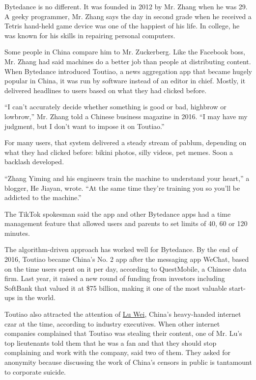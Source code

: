 Bytedance is no different. It was founded in 2012 by Mr. Zhang when he
was 29. A geeky programmer, Mr. Zhang says the day in second grade when
he received a Tetris hand-held game device was one of the happiest of
his life. In college, he was known for his skills in repairing personal
computers.

Some people in China compare him to Mr. Zuckerberg. Like the Facebook
boss, Mr. Zhang had said machines do a better job than people at
distributing content. When Bytedance introduced Toutiao, a news
aggregation app that became hugely popular in China, it was run by
software instead of an editor in chief. Mostly, it delivered headlines
to users based on what they had clicked before.

``I can't accurately decide whether something is good or bad, highbrow
or lowbrow,'' Mr. Zhang told a Chinese business magazine in 2016. ``I
may have my judgment, but I don't want to impose it on Toutiao.''

For many users, that system delivered a steady stream of pablum,
depending on what they had clicked before: bikini photos, silly videos,
pet memes. Soon a backlash developed.

``Zhang Yiming and his engineers train the machine to understand your
heart,'' a blogger, He Jiayan, wrote. ``At the same time they're
training you so you'll be addicted to the machine.''

The TikTok spokesman said the app and other Bytedance apps had a time
management feature that allowed users and parents to set limits of 40,
60 or 120 minutes.

The algorithm-driven approach has worked well for Bytedance. By the end
of 2016, Toutiao became China's No. 2 app after the messaging app
WeChat, based on the time users spent on it per day, according to
QuestMobile, a Chinese data firm. Last year, it raised a new round of
funding from investors including SoftBank that valued it at \$75
billion, making it one of the most valuable start-ups in the world.

Toutiao also attracted the attention of
\href{https://www.nytimes.com/2014/12/02/world/asia/gregarious-and-direct-chinas-web-doorkeeper.html}{Lu
Wei}, China's heavy-handed internet czar at the time, according to
industry executives. When other internet companies complained that
Toutiao was stealing their content, one of Mr. Lu's top lieutenants told
them that he was a fan and that they should stop complaining and work
with the company, said two of them. They asked for anonymity because
discussing the work of China's censors in public is tantamount to
corporate suicide.

